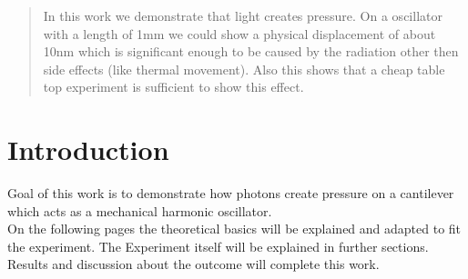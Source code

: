\documentclass[12pt,a4paper]{article}
\begin{document}

\pagebreak
\setlength{\columnsep}{20pt}

\begin{abstract}
\noindent
In this work we demonstrate that light creates pressure. On a oscillator with a length of 1mm we could show a physical displacement of about 10nm which is significant enough to be caused by the radiation other then side effects (like thermal movement). Also this shows that a cheap table top experiment is sufficient to show this effect.
\end{abstract}

%


\section{Introduction}
Goal of this work is to demonstrate how photons create pressure on a cantilever which acts as a mechanical harmonic oscillator.\\
On the following pages the theoretical basics will be explained and adapted to fit the experiment.
The Experiment itself will be explained in further sections. Results and discussion about the outcome
will complete this work.

\end{document}
